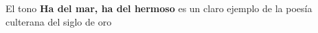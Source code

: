 El tono \textbf{Ha del mar, ha del hermoso} es un claro ejemplo de la poesía culterana del siglo de oro

\todo{}
